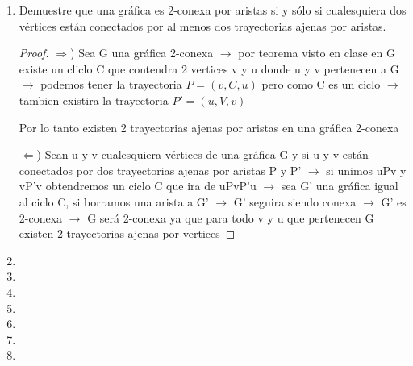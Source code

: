 \documentclass{article}
\begin{document}
\begin{enumerate}
  \item Demuestre que una gr\'afica es $2$-conexa por aristas si y s\'olo si
    cualesquiera dos v\'ertices est\'an conectados por al menos dos trayectorias
    ajenas por aristas.
  
  \begin{proof} 
     $\Longrightarrow$) Sea G una gráfica 2-conexa $\rightarrow$ por teorema visto en clase en G existe  un cliclo C que contendra 2 vertices v y u donde u y v pertenecen a G $\rightarrow$ podemos tener la trayectoria $P=(v,C,u)$ pero como C es un ciclo $\rightarrow$ tambien existira la trayectoria $P'=(u,V,v)$ 
     
     Por lo tanto existen 2 trayectorias ajenas por aristas en una gráfica 2-conexa 
     
     
     $\Longleftarrow$) Sean u y v cualesquiera vértices de una gráfica G y si u y v están conectados por dos trayectorias ajenas por aristas P y P' $\rightarrow$ si unimos  uPv y vP'v obtendremos un ciclo C que ira de uPvP'u $\rightarrow$ sea G' una gráfica igual al ciclo C, si borramos una arista a G' $\rightarrow$ G' seguira siendo conexa  $\rightarrow$ G' es 2-conexa $\rightarrow$ G será 2-conexa ya que para todo v y u que pertenecen G existen 2 trayectorias ajenas por vertices
     
      
  \end{proof}
  
\item
\item
\item
\item
\item
\item
\item
\end{enumerate}
\end{document}
